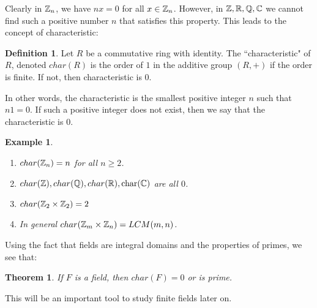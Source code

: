 \documentclass[12pt]{article}
\def\char{\text{char}} %
\theoremstyle{plain}
\newtheorem{example}{Example}
\newtheorem{theorem}{Theorem}
\theoremstyle{definition}
\newtheorem{definition}{Definition}
\theoremstyle{remark}
\begin{document}
Clearly in $\mathbb{Z}_n$, we have $nx=0$ for all $x\in \mathbb{Z}_n$. However, in $\mathbb{Z}, \mathbb{R}, \mathbb{Q}, \mathbb{C}$ we cannot find such a positive number $n$ that satisfies this property.
This leads to the concept of characteristic:
\begin{definition}
Let $R$ be a commutative ring with identity. The ``characteristic" of $R$, denoted $char(R)$ is the order of $1$ in the additive group $(R,+)$ if the order is finite. If not, then characteristic is $0$.
\end{definition}
In other words, the characteristic is the smallest positive integer $n$ such that $n1 =0$. If such a positive integer does not exist, then we say that the characteristic is $0$.

\begin{example}
\begin{enumerate}
    \item $char(\mathbb{Z}_n)=n$ for all $n\geq 2$.
    \item $char(\Z), char(\Q), char(\R), \char(\C)$ are all $0$.
    \item $char(\mathbb{Z}_2\times \mathbb{Z}_2) = 2$
    \item In general $char(\mathbb{Z}_m\times \mathbb{Z}_n) = LCM(m,n)$.
\end{enumerate}
\end{example}
Using the fact that fields are integral domains and the properties of primes, we see that:
\begin{theorem}
If $F$ is a field, then $char(F)=0$ or is prime.
\end{theorem}
This will be an important tool to study finite fields later on.
\end{document}
